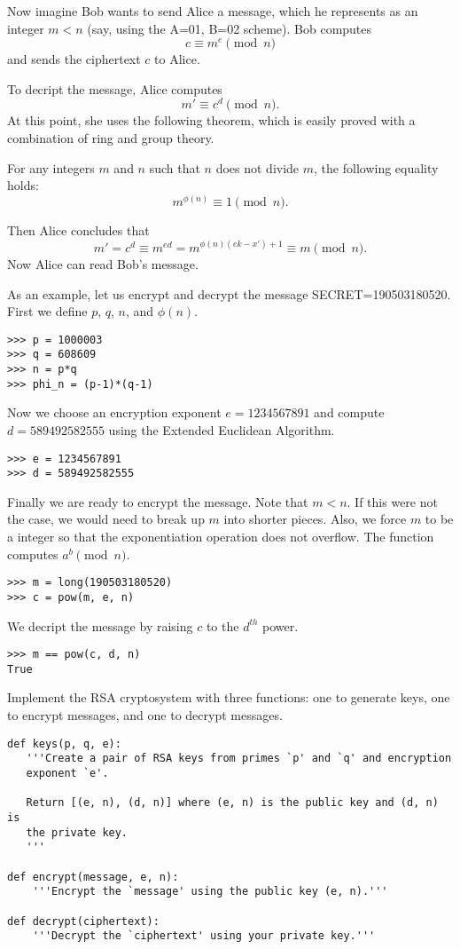 Now imagine Bob wants to send Alice a message, which he represents as an integer $m<n$ (say, using the A=01, B=02 scheme).
Bob computes 
\[
c \equiv m^e \pmod{n}
\]
and sends the ciphertext $c$ to Alice.

To decript the message, Alice computes
\[
m' \equiv c^d \pmod{n}.
\]
At this point, she uses the following theorem, which is easily proved with a combination of ring and group theory.
\begin{theorem}
For any integers $m$ and $n$ such that $n$ does not divide $m$, the following equality holds:
\[
m^{\phi(n)}\equiv 1 \pmod{n}.
\]
\end{theorem}
Then Alice concludes that
\[
m' = c^d \equiv m^{ed} = m^{\phi(n)(ek-x')+1} \equiv m \pmod{n}.
\]
Now Alice can read Bob's message.

As an example, let us encrypt and decrypt the message SECRET=190503180520.
First we define $p$, $q$, $n$, and $\phi(n)$.
\begin{lstlisting}
>>> p = 1000003
>>> q = 608609
>>> n = p*q
>>> phi_n = (p-1)*(q-1)
\end{lstlisting}

Now we choose an encryption exponent $e = 1234567891$ and compute $d = 589492582555$ using the Extended Euclidean Algorithm.
\begin{lstlisting}
>>> e = 1234567891
>>> d = 589492582555
\end{lstlisting}

Finally we are ready to encrypt the message. 
Note that $m<n$. If this were not the case, we would need to break up $m$ into shorter pieces.
Also, we force $m$ to be a  integer so that the exponentiation operation does not overflow.
The function  computes $a^b \pmod{n}$.
\begin{lstlisting}
>>> m = long(190503180520)
>>> c = pow(m, e, n)
\end{lstlisting}

We decript the message by raising $c$ to the $d^{th}$ power.
\begin{lstlisting}
>>> m == pow(c, d, n)
True
\end{lstlisting}

\begin{problem}
Implement the RSA cryptosystem with three functions: one to generate keys, one to encrypt messages, and one to decrypt messages.
\begin{lstlisting}
def keys(p, q, e):
   '''Create a pair of RSA keys from primes `p' and `q' and encryption 
   exponent `e'.
   
   Return [(e, n), (d, n)] where (e, n) is the public key and (d, n) is 
   the private key.
   '''
    
def encrypt(message, e, n):
    '''Encrypt the `message' using the public key (e, n).'''
    
def decrypt(ciphertext):
    '''Decrypt the `ciphertext' using your private key.'''
\end{lstlisting}
\label{prob:rsa1}
\end{problem}
